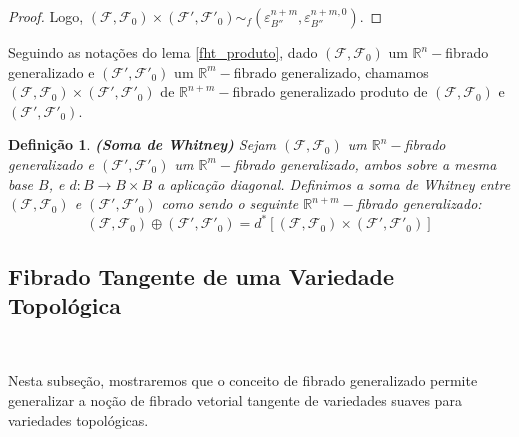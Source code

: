 \documentclass[12pt,oneside]{book} %
\newtheorem{defi}   {\hspace{0.5cm}Defini\c c\~ao}[chapter]
\newcommand{\R}{\mathbb{R}}
\begin{document}
\begin{proof}
	\par Logo, $(\mathcal{F},\mathcal{F}_{0})\times(\mathcal{F'},\mathcal{F'}_{0})\sim_{f}(\varepsilon^{n+m}_{B''},\varepsilon^{n+m,0}_{B''})$.
	
\end{proof}

\par Seguindo as notações do lema \ref{fht_produto}, dado $(\mathcal{F},\mathcal{F}_{0})$ um $\R^{n}-$fibrado generalizado e $(\mathcal{F'},\mathcal{F'}_{0})$ um $\R^{m}-$fibrado generalizado, chamamos $(\mathcal{F},\mathcal{F}_{0})\times(\mathcal{F'},\mathcal{F'}_{0})$ de $\R^{n+m}-$fibrado generalizado produto de $(\mathcal{F},\mathcal{F}_{0})$ e $(\mathcal{F'},\mathcal{F'}_{0})$.

\begin{defi}{\bf (Soma de Whitney)}
	Sejam $(\mathcal{F},\mathcal{F}_{0})$ um $\R^{n}-$fibrado generalizado e $(\mathcal{F'},\mathcal{F'}_{0})$ um $\R^{m}-$fibrado generalizado, ambos sobre a mesma base $B$, e $d:B\to B\times B$ a aplicação diagonal. Definimos a soma de Whitney entre $(\mathcal{F},\mathcal{F}_{0})$ e $(\mathcal{F'},\mathcal{F'}_{0})$ como sendo o seguinte $\R^{n+m}-$fibrado generalizado:
	$$ (\mathcal{F},\mathcal{F}_{0})\oplus(\mathcal{F'},\mathcal{F'}_{0})=d^{*}[(\mathcal{F},\mathcal{F}_{0})\times(\mathcal{F'},\mathcal{F'}_{0})] $$
\end{defi}






\subsection{Fibrado Tangente de uma Variedade Topológica}\label{secao_fht_tang}

\

\par Nesta subseção, mostraremos que o conceito de fibrado generalizado permite generalizar a noção de fibrado vetorial tangente de variedades suaves para variedades topológicas.
\end{document}
